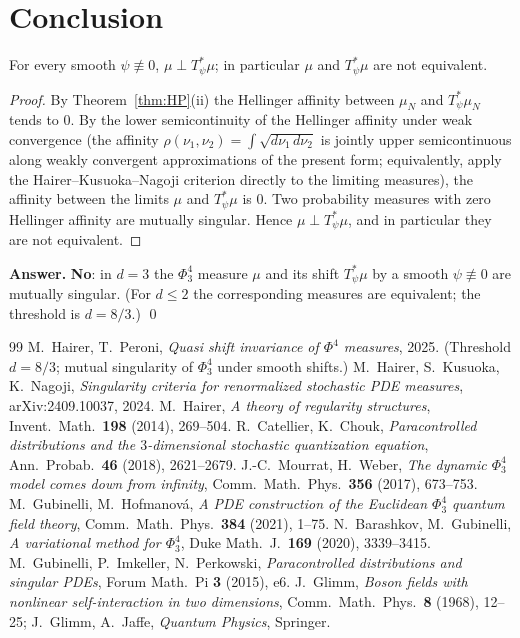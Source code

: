 \section*{Conclusion}

\begin{qonetheorem}\label{thm:main}
For every smooth $\psi\not\equiv0$, $\mu\perp T_\psi^*\mu$; in particular $\mu$ and
$T_\psi^*\mu$ are not equivalent.
\end{qonetheorem}
\begin{proof}
By Theorem~\ref{thm:HP}(ii) the Hellinger affinity between $\mu_N$ and $T_\psi^*\mu_N$
tends to $0$. By the lower semicontinuity of the Hellinger affinity under weak
convergence (the affinity $\rho(\nu_1,\nu_2)=\int\sqrt{d\nu_1\,d\nu_2}$ is jointly
upper semicontinuous along weakly convergent approximations of the present form;
equivalently, apply the Hairer--Kusuoka--Nagoji criterion \cite{HKN24} directly to the
limiting measures), the affinity between the limits $\mu$ and $T_\psi^*\mu$ is $0$.
Two probability measures with zero Hellinger affinity are mutually singular. Hence
$\mu\perp T_\psi^*\mu$, and in particular they are not equivalent.
\end{proof}

\medskip
\noindent\textbf{Answer.} \textbf{No}: in $d=3$ the $\Phi^4_3$ measure $\mu$ and its
shift $T_\psi^*\mu$ by a smooth $\psi\not\equiv0$ are mutually singular. (For $d\le2$
the corresponding measures are equivalent; the threshold is $d=8/3$.)
\qed

\begin{thebibliography}{99}
 M.~Hairer, T.~Peroni, \emph{Quasi shift invariance of $\Phi^4$ measures}, 2025. (Threshold $d=8/3$; mutual singularity of $\Phi^4_3$ under smooth shifts.)
 M.~Hairer, S.~Kusuoka, K.~Nagoji, \emph{Singularity criteria for renormalized stochastic PDE measures}, arXiv:2409.10037, 2024.
 M.~Hairer, \emph{A theory of regularity structures}, Invent.\ Math.\ \textbf{198} (2014), 269--504.
 R.~Catellier, K.~Chouk, \emph{Paracontrolled distributions and the $3$-dimensional stochastic quantization equation}, Ann.\ Probab.\ \textbf{46} (2018), 2621--2679.
 J.-C.~Mourrat, H.~Weber, \emph{The dynamic $\Phi^4_3$ model comes down from infinity}, Comm.\ Math.\ Phys.\ \textbf{356} (2017), 673--753.
 M.~Gubinelli, M.~Hofmanov\'a, \emph{A PDE construction of the Euclidean $\Phi^4_3$ quantum field theory}, Comm.\ Math.\ Phys.\ \textbf{384} (2021), 1--75.
 N.~Barashkov, M.~Gubinelli, \emph{A variational method for $\Phi^4_3$}, Duke Math.\ J.\ \textbf{169} (2020), 3339--3415.
 M.~Gubinelli, P.~Imkeller, N.~Perkowski, \emph{Paracontrolled distributions and singular PDEs}, Forum Math.\ Pi \textbf{3} (2015), e6.
 J.~Glimm, \emph{Boson fields with nonlinear self-interaction in two dimensions}, Comm.\ Math.\ Phys.\ \textbf{8} (1968), 12--25; J.~Glimm, A.~Jaffe, \emph{Quantum Physics}, Springer.
\end{thebibliography}
\endgroup
